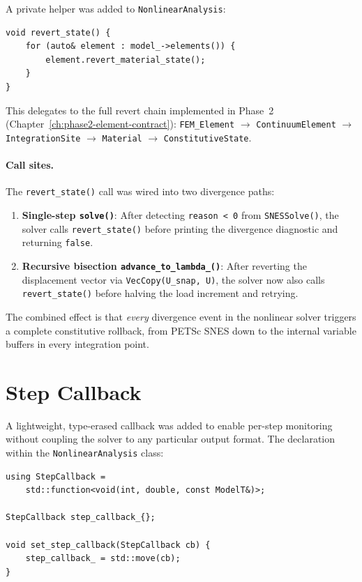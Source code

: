A private helper was added to \texttt{NonlinearAnalysis}:

\begin{verbatim}
void revert_state() {
    for (auto& element : model_->elements()) {
        element.revert_material_state();
    }
}
\end{verbatim}

This delegates to the full revert chain implemented in Phase~2
(Chapter~\ref{ch:phase2-element-contract}): \texttt{FEM\_Element}
$\to$ \texttt{ContinuumElement} $\to$ \texttt{IntegrationSite}
$\to$ \texttt{Material} $\to$ \texttt{ConstitutiveState}.

\paragraph{Call sites.}
The \texttt{revert\_state()} call was wired into two divergence paths:

\begin{enumerate}
  \item \textbf{Single-step \texttt{solve()}}: After detecting
        \texttt{reason < 0} from \texttt{SNESSolve()}, the solver calls
        \texttt{revert\_state()} before printing the divergence
        diagnostic and returning \texttt{false}.
  \item \textbf{Recursive bisection \texttt{advance\_to\_lambda\_()}}:
        After reverting the displacement vector via
        \texttt{VecCopy(U\_snap, U)}, the solver now also calls
        \texttt{revert\_state()} before halving the load increment and
        retrying.
\end{enumerate}

The combined effect is that \emph{every} divergence event in the
nonlinear solver triggers a complete constitutive rollback, from PETSc
SNES down to the internal variable buffers in every integration point.


\section{Step Callback}
\label{sec:phase3-step-callback}

A lightweight, type-erased callback was added to enable per-step
monitoring without coupling the solver to any particular output
format.  The declaration within the \texttt{NonlinearAnalysis} class:

\begin{verbatim}
using StepCallback =
    std::function<void(int, double, const ModelT&)>;

StepCallback step_callback_{};

void set_step_callback(StepCallback cb) {
    step_callback_ = std::move(cb);
}
\end{verbatim}

